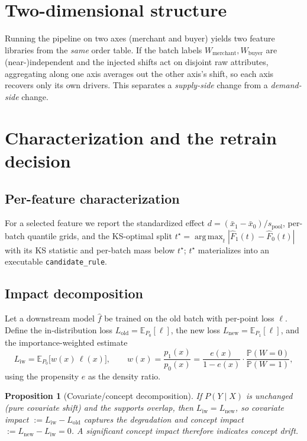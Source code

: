 \documentclass[11pt]{article}
\newtheorem{proposition}{Proposition}
\DeclareMathOperator*{\argmax}{arg\,max}
\newcommand{\E}{\mathbb{E}}
\newcommand{\PR}{\mathbb{P}}
\begin{document}
\section{Two-dimensional structure}

Running the pipeline on two axes (merchant and buyer) yields two feature
libraries from the \emph{same} order table. If the batch labels
$W_{\text{merchant}},W_{\text{buyer}}$ are (near-)independent and the injected
shifts act on disjoint raw attributes, aggregating along one axis averages out
the other axis's shift, so each axis recovers only its own drivers. This
separates a \emph{supply-side} change from a \emph{demand-side} change.

\section{Characterization and the retrain decision}

\subsection{Per-feature characterization}
For a selected feature we report the standardized effect
$d=(\bar x_1-\bar x_0)/s_{\mathrm{pool}}$, per-batch quantile grids, and the
KS-optimal split $t^\star=\argmax_t|\hat F_1(t)-\hat F_0(t)|$ with its KS
statistic and per-batch mass below $t^\star$; $t^\star$ materializes into an
executable \texttt{candidate\_rule}.

\subsection{Impact decomposition}
Let a downstream model $\hat f$ be trained on the old batch with per-point loss
$\ell$. Define the in-distribution loss $L_{\mathrm{old}}=\E_{P_0}[\ell]$, the new
loss $L_{\mathrm{new}}=\E_{P_1}[\ell]$, and the importance-weighted estimate
\begin{equation}
L_{\mathrm{iw}}=\E_{P_0}\!\bigl[w(x)\,\ell(x)\bigr],\qquad
w(x)=\frac{p_1(x)}{p_0(x)}=\frac{e(x)}{1-e(x)}\cdot\frac{\PR(W=0)}{\PR(W=1)} ,
\end{equation}
using the propensity $e$ as the density ratio.
\begin{proposition}[Covariate/concept decomposition]
If $P(Y\mid X)$ is unchanged (pure covariate shift) and the supports overlap,
then $L_{\mathrm{iw}}=L_{\mathrm{new}}$, so
\emph{covariate impact} $:=L_{\mathrm{iw}}-L_{\mathrm{old}}$ captures the
degradation and \emph{concept impact} $:=L_{\mathrm{new}}-L_{\mathrm{iw}}=0$.
A significant concept impact therefore indicates concept drift.
\end{proposition}
\end{document}
